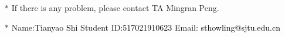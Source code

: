 \documentclass[12pt,a4paper]{article}
\theoremstyle{definition}
\begin{document}
\noindent

\noindent{}


\begin{center}
\footnotesize{\color{red}$*$ If there is any problem, please contact TA Mingran Peng.}\par
\footnotesize{\color{blue}$*$ Name:{\textcolor{black}{Tianyao Shi}}  \quad Student ID:{\textcolor{black}{517021910623}} \quad Email: {\textcolor{black}{sthowling@sjtu.edu.cn}}}
\end{center}
\end{document}
